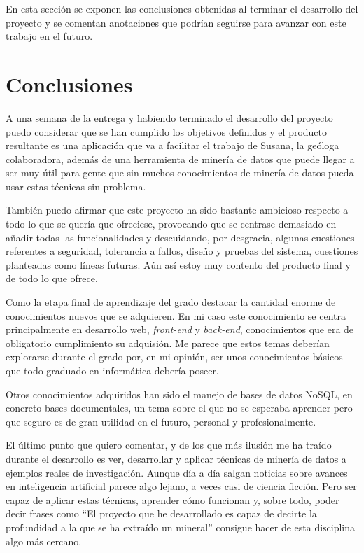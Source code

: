 
En esta sección se exponen las conclusiones obtenidas al terminar el desarrollo
del proyecto y se comentan anotaciones que podrían seguirse para avanzar con
este trabajo en el futuro.

\section{Conclusiones}

A una semana de la entrega y habiendo terminado el desarrollo del proyecto puedo
considerar que se han cumplido los objetivos definidos y el producto resultante
es una aplicación que va a facilitar el trabajo de Susana, la geóloga
colaboradora, además de una herramienta de minería de datos que puede llegar a
ser muy útil para gente que sin muchos conocimientos de minería de datos pueda
usar estas técnicas sin problema.

También puedo afirmar que este proyecto ha sido bastante ambicioso respecto a
todo lo que se quería que ofreciese, provocando que se centrase demasiado en
añadir todas las funcionalidades y descuidando, por desgracia, algunas
cuestiones referentes a seguridad, tolerancia a fallos, diseño y pruebas del
sistema, cuestiones planteadas como líneas futuras. Aún así estoy muy contento
del producto final y de todo lo que ofrece.

Como la etapa final de aprendizaje del grado destacar la cantidad enorme de
conocimientos nuevos que se adquieren. En mi caso este conocimiento se centra
principalmente en desarrollo web, \textit{front-end} y \textit{back-end},
conocimientos que era de obligatorio cumplimiento su adquisión. Me parece que
estos temas deberían explorarse durante el grado por, en mi opinión, ser unos
conocimientos básicos que todo graduado en informática debería poseer.

Otros conocimientos adquiridos han sido el manejo de bases de datos NoSQL, en
concreto bases documentales, un tema sobre el que no se esperaba aprender pero
que seguro es de gran utilidad en el futuro, personal y profesionalmente.

El último punto que quiero comentar, y de los que más ilusión me ha traído
durante el desarrollo es ver, desarrollar y aplicar técnicas de minería de datos
a ejemplos reales de investigación. Aunque día a día salgan noticias sobre
avances en inteligencia artificial parece algo lejano, a veces casi de ciencia
ficción. Pero ser capaz de aplicar estas técnicas, aprender cómo funcionan y,
sobre todo, poder decir frases como ``El proyecto que he desarrollado es capaz
de decirte la profundidad a la que se ha extraído un mineral'' consigue hacer de
esta disciplina algo más cercano.

